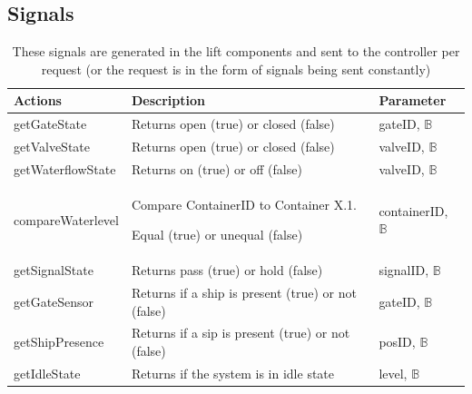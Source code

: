 		\subsection{Signals}
		\begin{table}[htbp]
			\centering
			\caption{These signals are generated in the lift components and sent to the controller per request (or the request is in the form of signals being sent constantly)}
			\begin{tabular}{lll}
				\toprule
				\textbf{Actions} & \textbf{Description} & \textbf{Parameter} \\
				\hline
				getGateState & Returns open (true) or closed (false) & gateID, $ \mathbb{B} $ \\
				getValveState & Returns open (true) or closed (false) & valveID, $ \mathbb{B} $ \\
				getWaterflowState & Returns on (true) or off (false) & valveID, $ \mathbb{B} $ \\
				compareWaterlevel & \parbox[t]{3in}{Compare ContainerID to Container X.1. \par Equal (true) or unequal (false)} & containerID, $ \mathbb{B} $ \\
				getSignalState & Returns pass (true) or hold (false) & signalID, $ \mathbb{B} $ \\
				getGateSensor & Returns if a ship is present (true) or not (false) & gateID, $ \mathbb{B} $ \\
				getShipPresence  & Returns if a sip is present (true) or not (false) & posID, $ \mathbb{B} $ \\
				getIdleState & Returns if the system is in idle state & level, $ \mathbb{B} $ \\
				\bottomrule
			\end{tabular}%
				\label{tab:addlabel}%
				\end{table}%
				
				
